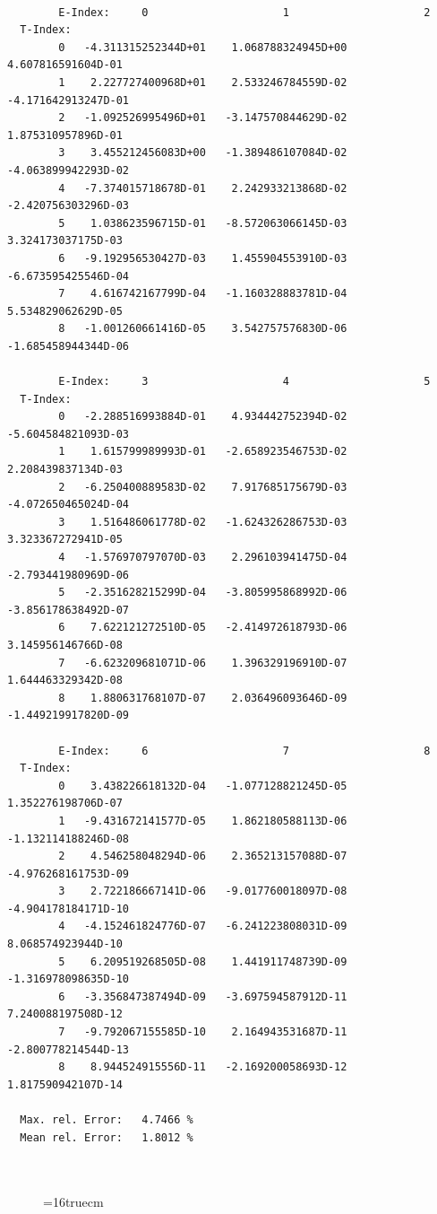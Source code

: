 \documentclass[12pt,dvips]{article}
\begin{document}
\begin{small}\begin{verbatim}

        E-Index:     0                     1                     2
  T-Index:
        0   -4.311315252344D+01    1.068788324945D+00    4.607816591604D-01
        1    2.227727400968D+01    2.533246784559D-02   -4.171642913247D-01
        2   -1.092526995496D+01   -3.147570844629D-02    1.875310957896D-01
        3    3.455212456083D+00   -1.389486107084D-02   -4.063899942293D-02
        4   -7.374015718678D-01    2.242933213868D-02   -2.420756303296D-03
        5    1.038623596715D-01   -8.572063066145D-03    3.324173037175D-03
        6   -9.192956530427D-03    1.455904553910D-03   -6.673595425546D-04
        7    4.616742167799D-04   -1.160328883781D-04    5.534829062629D-05
        8   -1.001260661416D-05    3.542757576830D-06   -1.685458944344D-06

        E-Index:     3                     4                     5
  T-Index:
        0   -2.288516993884D-01    4.934442752394D-02   -5.604584821093D-03
        1    1.615799989993D-01   -2.658923546753D-02    2.208439837134D-03
        2   -6.250400889583D-02    7.917685175679D-03   -4.072650465024D-04
        3    1.516486061778D-02   -1.624326286753D-03    3.323367272941D-05
        4   -1.576970797070D-03    2.296103941475D-04   -2.793441980969D-06
        5   -2.351628215299D-04   -3.805995868992D-06   -3.856178638492D-07
        6    7.622121272510D-05   -2.414972618793D-06    3.145956146766D-08
        7   -6.623209681071D-06    1.396329196910D-07    1.644463329342D-08
        8    1.880631768107D-07    2.036496093646D-09   -1.449219917820D-09

        E-Index:     6                     7                     8
  T-Index:
        0    3.438226618132D-04   -1.077128821245D-05    1.352276198706D-07
        1   -9.431672141577D-05    1.862180588113D-06   -1.132114188246D-08
        2    4.546258048294D-06    2.365213157088D-07   -4.976268161753D-09
        3    2.722186667141D-06   -9.017760018097D-08   -4.904178184171D-10
        4   -4.152461824776D-07   -6.241223808031D-09    8.068574923944D-10
        5    6.209519268505D-08    1.441911748739D-09   -1.316978098635D-10
        6   -3.356847387494D-09   -3.697594587912D-11    7.240088197508D-12
        7   -9.792067155585D-10    2.164943531687D-11   -2.800778214544D-13
        8    8.944524915556D-11   -2.169200058693D-12    1.817590942107D-14

  Max. rel. Error:   4.7466 %
  Mean rel. Error:   1.8012 %



\end{verbatim}\end{small}
\begin{figure} \label{2.2a}
\epsfxsize=16truecm
\end{figure}
\newpage
\end{document}

